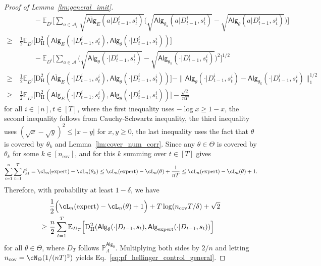 \documentclass[10pt]{article}
\newcommand{\<}{\left\langle}
\renewcommand{\>}{\right\rangle}
\newcommand{\E}{\mathbb{E}}
\renewcommand{\P}{\mathbb{P}}
\newcommand{\HelDs}{{\mathrm{D}^2_{\mathrm{H}}}}
\newcommand{\Covnum}{{n_{\mathrm{cov}}}}
\newcommand{\state}{{s}}
\newcommand{\action}{{a}}
\newcommand{\totlen}{{T}}
\newcommand{\ith}{{i}}
\newcommand{\sAlg}{{\mathsf{Alg}}}
\newcommand{\osAlg}{\overline{\mathsf{Alg}}}
\newcommand{\dset}{{D}}
\newcommand{\Numobs}{{n}}
\newcommand{\Par}{{\theta}}
\newcommand{\Parspace}{{\Theta}}
\newcommand{\prior}{{\Lambda}}
\newcommand{\actionsp}{{\mathcal{A}}}
\newcommand{\expert}{{\mathrm{expert}}}
\newcommand{\shortexp}{{E}}
\begin{document}
\begin{proof}[Proof of Lemma~\ref{lm:general_imit}]
\begin{align*}
&\qquad~- \E_{\dset^\ith}\Big[\sum_{\action\in\actionsp_t}\sqrt{\osAlg_{\shortexp}(\action|\dset_{t-1}^\ith,\state^\ith_t)}\Big(\sqrt{\sAlg_{\Par_k}(\action|\dset_{t-1}^\ith,\state^\ith_t)}-\sqrt{\sAlg_{\Par}(\action|\dset_{t-1}^\ith,\state^\ith_t)}\Big)\Big]
\\
\geq &~
    \frac{1}{2} \E_{\dset^\ith}\Big[\HelDs(\osAlg_{\shortexp}(\cdot|\dset_{t-1}^\ith,\state^\ith_t),\sAlg_{\Par}(\cdot|\dset_{t-1}^\ith,\state^\ith_t))\Big]
    \\
    &\qquad~-\E_{\dset^\ith}\Big[\sum_{\action\in\actionsp}\Big(\sqrt{\sAlg_{\Par}(\cdot|\dset_{t-1}^\ith,\state^\ith_t)}-\sqrt{\sAlg_{\Par_k}(\cdot|\dset_{t-1}^\ith,\state^\ith_t)}\Big)^2\Big]^{1/2}
\\
\geq &~
 \frac{1}{2} \E_{\dset^\ith}\Big[\HelDs(\osAlg_{\shortexp}(\cdot|\dset_{t-1}^\ith,\state^\ith_t),\sAlg_{\Par}(\cdot|\dset_{t-1}^\ith,\state^\ith_t))\Big]
    -\|\sAlg_{\Par}(\cdot|\dset_{t-1}^\ith,\state^\ith_t)-\sAlg_{\Par_k}(\cdot|\dset_{t-1}^\ith,\state^\ith_t)\|_1^{1/2}
\\
\geq&~
 \frac{1}{2} \E_{\dset^\ith}\Big[\HelDs(\osAlg_{\shortexp}(\cdot|\dset_{t-1}^\ith,\state^\ith_t),\sAlg_{\Par}(\cdot|\dset_{t-1}^\ith,\state^\ith_t))\Big]
  -\frac{\sqrt{2}}{\Numobs\totlen}
\end{align*}
for all $i\in[n],t\in[\totlen]$,
where the first inequality uses $-\log x\geq 1-x$, the second inequality follows from Cauchy-Schwartz inequality, the third inequality uses $(\sqrt{x}-\sqrt{y})^2\leq |x-y|$ for $x,y\geq0$, the last inequality uses the fact that $\Par$ is covered by $\Par_k$ and Lemma~\ref{lm:cover_num_corr}. Since any $\Par\in\Parspace$ is covered by $\Par_k$ for some $k\in[\Covnum]$, and for this $k$ summing over $t\in[T]$ gives
$$\sum_{i=1}^\Numobs\sum_{t=1}^\totlen\ell_{kt}^i=\cL_\Numobs(\expert)-\cL_\Numobs(\Par_k) \leq \cL_\Numobs(\expert)-\cL_\Numobs(\Par)+\frac{1}{\Numobs\totlen}\leq \cL_\Numobs(\expert)-\cL_\Numobs(\Par)+1.$$
Therefore, with probability at least $1-\delta$, we have
\begin{align*}
&~\frac{1}{2}\Big(\cL_\Numobs(\expert)-\cL_\Numobs(\Par)+1 \Big)+\totlen\log(\Covnum \totlen/\delta)+\sqrt{2}\\
\geq&~ \frac{\Numobs}{2}\sum_{t=1}^\totlen\E_{\dset_\totlen}\Big[\HelDs(\sAlg_\Par(\cdot|\dset_{t-1},\state_t),\sAlg_\expert(\cdot|\dset_{t-1},\state_t))\Big]
\end{align*}
for all $\Par\in\Parspace$, where $\dset_\totlen$  follows $\P_\prior^{\sAlg_0}$. Multiplying both sides by $2/\Numobs$ and letting $\Covnum=\cN_{\Parspace}(1/(\Numobs\totlen)^2)$ yields Eq.~\eqref{eq:pf_hellinger_control_general}.
\end{proof}
\end{document}
